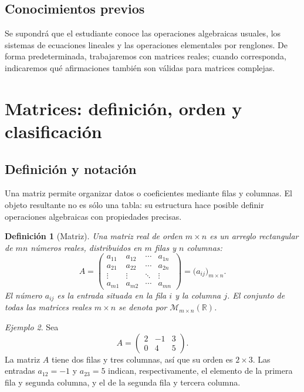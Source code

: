 \documentclass[12pt]{article}
\newtheorem{definicion}{Definición}[section]
\theoremstyle{remark}
\newtheorem{ejemplo}[definicion]{Ejemplo}
\newcommand{\R}{\mathbb{R}}
\newcommand{\Mat}[2]{\mathcal{M}_{#1\times #2}}
\begin{document}
\subsection*{Conocimientos previos}
Se supondrá que el estudiante conoce las operaciones algebraicas usuales, los sistemas de ecuaciones lineales y las operaciones elementales por renglones. De forma predeterminada, trabajaremos con matrices reales; cuando corresponda, indicaremos qué afirmaciones también son válidas para matrices complejas.

\section{Matrices: definición, orden y clasificación}
\subsection{Definición y notación}
Una matriz permite organizar datos o coeficientes mediante filas y columnas. El objeto resultante no es sólo una tabla: su estructura hace posible definir operaciones algebraicas con propiedades precisas.

\begin{definicion}[Matriz]
Una \emph{matriz real de orden $m\times n$} es un arreglo rectangular de $mn$ números reales, distribuidos en $m$ filas y $n$ columnas:
\[
A=\begin{pmatrix}
a_{11}&a_{12}&\cdots&a_{1n}\\
a_{21}&a_{22}&\cdots&a_{2n}\\
\vdots&\vdots&\ddots&\vdots\\
a_{m1}&a_{m2}&\cdots&a_{mn}
\end{pmatrix}=\bigl(a_{ij}\bigr)_{m\times n}.
\]
El número $a_{ij}$ es la entrada situada en la fila $i$ y la columna $j$. El conjunto de todas las matrices reales $m\times n$ se denota por $\Mat{m}{n}(\R)$.
\end{definicion}

\begin{ejemplo}
Sea
\[
A=\begin{pmatrix}2&-1&3\\0&4&5\end{pmatrix}.
\]
La matriz $A$ tiene dos filas y tres columnas, así que su orden es $2\times3$. Las entradas $a_{12}=-1$ y $a_{23}=5$ indican, respectivamente, el elemento de la primera fila y segunda columna, y el de la segunda fila y tercera columna.
\end{ejemplo}
\end{document}
